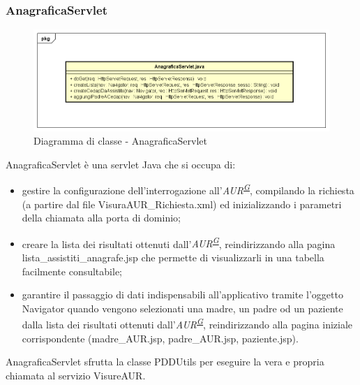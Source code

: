 \documentclass[a4paper]{article}
\begin{document}
\subsubsection{AnagraficaServlet}
\begin{figure}[H]
	\centering
	\includegraphics[width=\linewidth]{uml/anagraficaservlet.png}
	\caption{Diagramma di classe - AnagraficaServlet}
\end{figure}
AnagraficaServlet è una servlet Java che si occupa di:
\begin{itemize}
	\item gestire la configurazione dell'interrogazione all'\textit{AUR\textsuperscript{\hyperref[sec:gl]{G}}}, compilando la richiesta (a partire dal file VisuraAUR\_Richiesta.xml) ed inizializzando i parametri della chiamata alla porta di dominio;
    \item creare la lista dei risultati ottenuti dall'\textit{AUR\textsuperscript{\hyperref[sec:gl]{G}}}, reindirizzando alla pagina lista\_assistiti\_anagrafe.jsp che permette di visualizzarli in una tabella facilmente consultabile;
    \item garantire il passaggio di dati indispensabili all'applicativo tramite l'oggetto Navigator quando vengono selezionati una madre, un padre od un paziente dalla lista dei risultati ottenuti dall'\textit{AUR\textsuperscript{\hyperref[sec:gl]{G}}}, reindirizzando alla pagina iniziale corrispondente (madre\_AUR.jsp, padre\_AUR.jsp, paziente.jsp).
\end{itemize}
AnagraficaServlet sfrutta la classe PDDUtils per eseguire la vera e propria chiamata al servizio VisureAUR.
\end{document}
